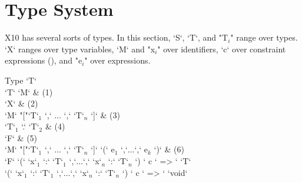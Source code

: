 \section{Type System}



X10 has several sorts of types. 
In this section, \xcd`S`, \xcd`T`, and 
\xcdmath"T$_i$" range over types.  \xcd`X` ranges over type variables, 
\xcd`M` and \xcdmath"x$_i$" over identifiers, 
\xcd`c` over constraint expressions (), 
and \xcdmath"e$_i$" over expressions. 

\begin{bbgrammar}
Type \: \xcd`T` \\
\xcd`T` \: \xcd`M`  & (1)\\
  \: \xcd`X` & (2) \\
  \: \xcd`M` \xcd"["\xcd`T`$_1$ \xcd`,` $\ldots$ \xcd`,` \xcd`T`$_n$ \xcd`]` & (3)\\
  \: \xcd`T`$_1$  \xcd`.` \xcd`T`$_2$ & (4)\\
  \: \xcd`F` & (5)\\
  \: \xcd`M` \xcd"["\xcd`T`$_1$ \xcd`,` $\ldots$ \xcd`,` \xcd`T`$_n$ \xcd`]` 
       \xcd`(` e$_1$ \xcd`,`$\ldots$\xcd`,` e$_k$ \xcd`)` & (6) \\
\xcd`F` \: \xcd`(` \xcd`x`$_1$ \xcd`:` \xcd`T`$_1$ \xcd`,`$\ldots$\xcd`,`
             \xcd`x`$_n$ \xcd`:` \xcd`T`$_n$ \xcd`) {` c  \xcd`} => ` \xcd`T` \\

  \: \xcd`(` \xcd`x`$_1$ \xcd`:` \xcd`T`$_1$ \xcd`,`$\ldots$\xcd`,`
             \xcd`x`$_n$ \xcd`:` \xcd`T`$_n$ \xcd`) {` c  \xcd`} => ` \xcd`void` 
\end{bbgrammar}

